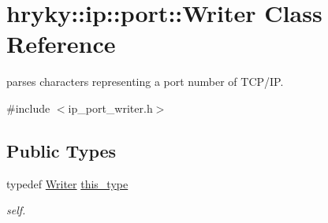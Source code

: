 \hypertarget{classhryky_1_1ip_1_1port_1_1_writer}{\section{hryky\-:\-:ip\-:\-:port\-:\-:Writer Class Reference}
\label{classhryky_1_1ip_1_1port_1_1_writer}
}


parses characters representing a port number of T\-C\-P/\-I\-P.  




{\ttfamily \#include $<$ip\-\_\-port\-\_\-writer.\-h$>$}

\subsection*{Public Types}
\begin{DoxyCompactItemize}
\item 
\hypertarget{classhryky_1_1ip_1_1port_1_1_writer_ab3ca05b8279270920a83e984f5795ea2}{typedef \hyperlink{classhryky_1_1ip_1_1port_1_1_writer}{Writer} \hyperlink{classhryky_1_1ip_1_1port_1_1_writer_ab3ca05b8279270920a83e984f5795ea2}{this\-\_\-type}}\label{classhryky_1_1ip_1_1port_1_1_writer_ab3ca05b8279270920a83e984f5795ea2}

\begin{DoxyCompactList}\small\item\em self. \end{DoxyCompactList}\end{DoxyCompactItemize}
